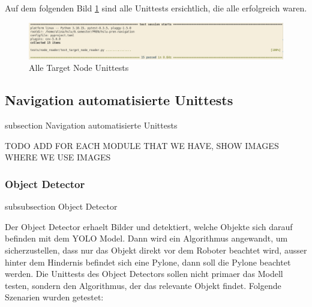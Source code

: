 \begin{table}[H]
\begin{tabularx}
  \hline
\end{tabularx}
\caption{Target Node Recognition Testprotokoll}
\label{table:target-node-test}
\end{table}



Auf dem folgenden Bild \ref{img:target_node_unittests} sind alle Unittests ersichtlich, die alle erfolgreich waren.

\begin{figure}[H]
\centering
\includegraphics[width=\textwidth]{assets/IT/testing/target_node/target_node_reader_unittests.png}
\caption{Alle Target Node Unittests}
\label{img:target_node_unittests}
\end{figure}

\newpage
\subsection*{Navigation automatisierte Unittests}\label{nav-unittests}
    {subsection}
    {Navigation automatisierte Unittests}

TODO ADD FOR EACH MODULE THAT WE HAVE, SHOW IMAGES WHERE WE USE IMAGES



\newpage
\subsubsection*{Object Detector}\label{object-detector-unittests}
{subsubsection}
{Object Detector}

Der Object Detector erhaelt Bilder und detektiert, welche Objekte sich darauf befinden mit dem YOLO Model. Dann wird ein Algorithmus angewandt, um sicherzustellen, dass nur das Objekt direkt vor dem Roboter beachtet wird, ausser hinter dem Hindernis befindet sich eine Pylone, dann soll die Pylone beachtet werden.
Die Unittests des Object Detectors sollen nicht primaer das Modell testen, sondern den Algorithmus, der das relevante Objekt findet. Folgende Szenarien wurden getestet:

